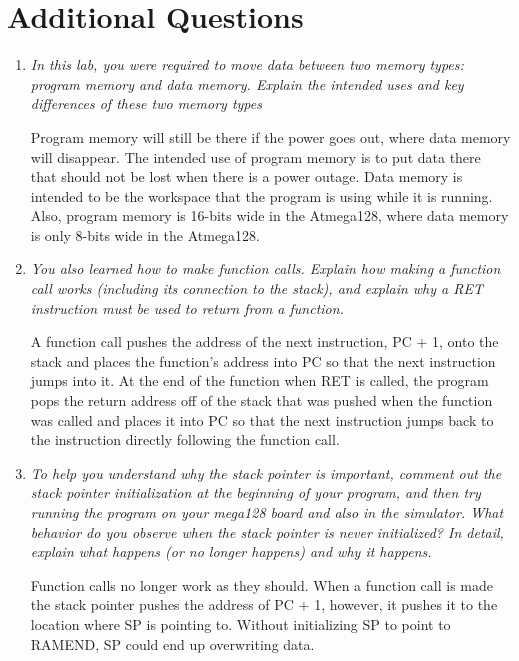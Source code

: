 \documentclass[12pt,letterpaper]{article}
\begin{document}
\section{Additional Questions}
\begin{enumerate}
    \item
	\textit{In this lab, you were required to move data between two memory types:
	program memory and data memory. 
	Explain the intended uses and key differences of these two memory types}

	Program memory will still be there if the power goes out, where data memory will disappear.
	The intended use of program memory is to put data there that should not be lost when there is a power outage.
	Data memory is intended to be the workspace that the program is using while it is running.
	Also, program memory is 16-bits wide in the Atmega128, where data memory is only 8-bits wide in the Atmega128.

	\item
	\textit{You also learned how to make function calls. 
		Explain how making a function call works (including its connection to the stack), and explain why a RET instruction must be used to return from a function.}
	
		A function call pushes the address of the next instruction, PC + 1, onto the stack and places the function's address into PC so that the next instruction jumps into it.
		At the end of the function when RET is called, the program pops the return address off of the stack that was pushed when the function was called and places it into PC so that the next instruction jumps back to the instruction directly following the function call.
	
	\item 
	\textit{To help you understand why the stack pointer is important, comment out
		the stack pointer initialization at the beginning of your program, and then
		try running the program on your mega128 board and also in the simulator.
		What behavior do you observe when the stack pointer is never initialized?
		In detail, explain what happens (or no longer happens) and why it happens.}

	Function calls no longer work as they should.
	When a function call is made the stack pointer pushes the address of PC + 1, however, it pushes it to the location where SP is pointing to.
	Without initializing SP to point to RAMEND, SP could end up overwriting data.
   
\end{enumerate}
\end{document}
